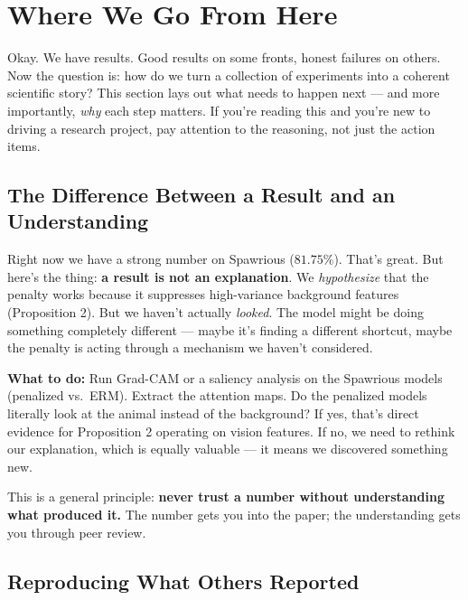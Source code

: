 \documentclass[11pt,a4paper]{article}
\begin{document}
\newpage

\section{Where We Go From Here}
\label{sec:nextsteps}

Okay. We have results. Good results on some fronts, honest failures on others. Now the question is: how do we turn a collection of experiments into a coherent scientific story? This section lays out what needs to happen next --- and more importantly, \emph{why} each step matters. If you're reading this and you're new to driving a research project, pay attention to the reasoning, not just the action items.

\subsection{The Difference Between a Result and an Understanding}

Right now we have a strong number on Spawrious ($81.75\%$). That's great. But here's the thing: \textbf{a result is not an explanation}. We \emph{hypothesize} that the penalty works because it suppresses high-variance background features (Proposition 2). But we haven't actually \emph{looked}. The model might be doing something completely different --- maybe it's finding a different shortcut, maybe the penalty is acting through a mechanism we haven't considered.

\textbf{What to do:} Run Grad-CAM or a saliency analysis on the Spawrious models (penalized vs.\ ERM). Extract the attention maps. Do the penalized models literally look at the animal instead of the background? If yes, that's direct evidence for Proposition 2 operating on vision features. If no, we need to rethink our explanation, which is equally valuable --- it means we discovered something new.

This is a general principle: \textbf{never trust a number without understanding what produced it.} The number gets you into the paper; the understanding gets you through peer review.

\subsection{Reproducing What Others Reported}
\end{document}
